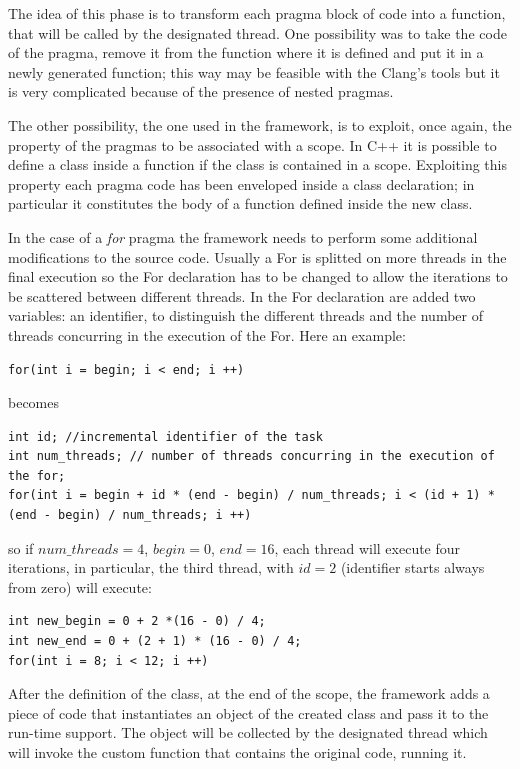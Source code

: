 \documentclass[a4paper,11pt,oneside]{book}
\begin{document}
The idea of this phase is to transform each pragma block of code into a function, that will be called by the designated thread. One possibility was to take the code of the pragma, remove it from the function where it is defined and put it in a newly generated function; this way may be feasible with the Clang’s tools but it is very complicated because of the presence of nested pragmas. 

The other possibility, the one used in the framework, is to exploit, once again, the property of the pragmas to be associated with a scope. In C++ it is possible to define a class inside a function if the class is contained in a scope. Exploiting this property each pragma code has been enveloped inside a class declaration; in particular it constitutes the body of a function defined inside the new class.

In the case of a \emph{for} pragma the framework needs to perform some additional modifications to the source code. Usually a For is splitted on more threads in the final execution so the For declaration has to be changed to allow the iterations to be scattered between different threads. In the For declaration are added two variables: an identifier, to distinguish the different threads and the number of threads concurring in the execution of the For. Here an example:

\begin{lstlisting}[language=CCC]
for(int i = begin; i < end; i ++)
\end{lstlisting}
becomes

\begin{lstlisting}[language=CCC]
int id; //incremental identifier of the task
int num_threads; // number of threads concurring in the execution of the for;
for(int i = begin + id * (end - begin) / num_threads; i < (id + 1) * (end - begin) / num_threads; i ++)
\end{lstlisting}
so if $num\_threads  = 4$, $begin = 0$, $end = 16$, each thread will execute four iterations, in particular, the third thread, with $id = 2$ (identifier starts always from zero) will execute:
\begin{lstlisting}[language=CCC]
int new_begin = 0 + 2 *(16 - 0) / 4;
int new_end = 0 + (2 + 1) * (16 - 0) / 4;
for(int i = 8; i < 12; i ++)
\end{lstlisting}

After the definition of the class, at the end of the scope, the framework adds a piece of code that instantiates an object of the created class and pass it to the run-time support. The object will be collected by the designated thread which will invoke the custom function that contains the original code, running it. 
\end{document}
